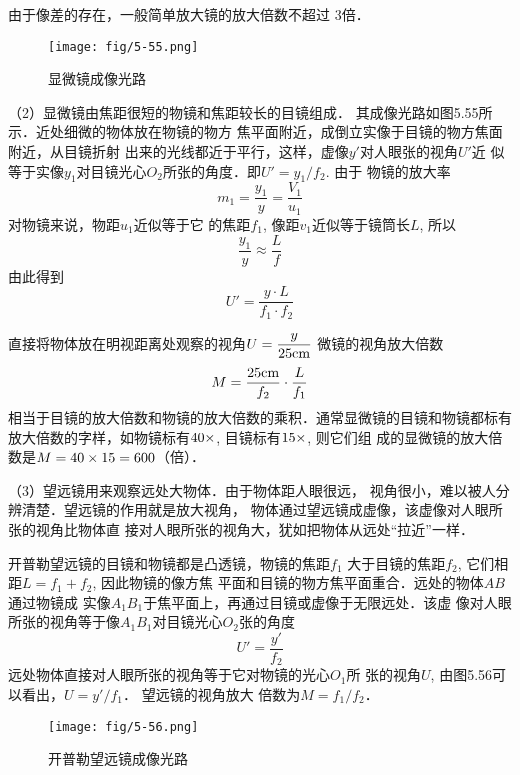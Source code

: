 由于像差的存在，一般简单放大镜的放大倍数不超过
3倍．

\begin{figure}[htp]\centering
    \texttt{[image: fig/5-55.png]}
        \caption{显微镜成像光路}
        \end{figure}

（2）显微镜由焦距很短的物镜和焦距较长的目镜组成．
其成像光路如图5.55所示．近处细微的物体放在物镜的物方
焦平面附近，成倒立实像于目镜的物方焦面附近，从目镜折射
出来的光线都近于平行，这样，虚像$y'$对人眼张的视角$U'$近
似等于实像$y_1$对目镜光心$O_2$所张的角度．即$U'=y_1/f_2$. 
由于
物镜的放大率
\[m_1=\frac{y_1}{y}=\frac{V_1}{u_1}\]
对物镜来说，物距$u_1$近似等于它
的焦距$f_1$, 像距$v_1$近似等于镜筒长$L$, 所以
\[\frac{y_1}{y}\approx \frac{L}{f}\]
由此得到
\[U'=\frac{y\cdot L}{f_1\cdot f_2}\]

直接将物体放在明视距离处观察的视角$U=\dfrac{y}{25{\rm cm}}$
微镜的视角放大倍数
\[M=\frac{25{\rm cm}}{f_2}\cdot \frac{L}{f_1}\]
相当于目镜的放大倍数和物镜的放大倍数的乘积．通常显微镜的目镜和物镜都标有
放大倍数的字样，如物镜标有$40\times$, 目镜标有$15\times$, 则它们组
成的显微镜的放大倍数是$M=40\times15=600$（倍）．

（3）望远镜用来观察远处大物体．由于物体距人眼很远，
视角很小，难以被人分辨清楚．望远镜的作用就是放大视角，
物体通过望远镜成虚像，该虚像对人眼所张的视角比物体直
接对人眼所张的视角大，犹如把物体从远处“拉近”一样．

开普勒望远镜的目镜和物镜都是凸透镜，物镜的焦距$f_1$
大于目镜的焦距$f_2$, 它们相距$L=f_1+f_2$, 因此物镜的像方焦
平面和目镜的物方焦平面重合．远处的物体$AB$通过物镜成
实像$A_1B_1$于焦平面上，再通过目镜或虚像于无限远处．该虚
像对人眼所张的视角等于像$A_1B_1$对目镜光心$O_2$张的角度
\[U'=\frac{y'}{f_2}\]
远处物体直接对人眼所张的视角等于它对物镜的光心$O_1$所
张的视角$U$, 由图5.56可以看出，$U=y'/f_1$．
望远镜的视角放大
倍数为$M=f_1/f_2$．

\begin{figure}[htp]\centering
    \texttt{[image: fig/5-56.png]}
        \caption{开普勒望远镜成像光路}
        \end{figure}

